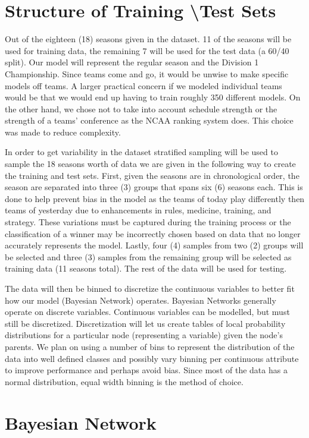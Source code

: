 \documentclass{acm_proc_article-sp}
\begin{document}
\section{Structure of Training \textbackslash Test Sets}
Out of the eighteen (18) seasons given in the dataset. 11 of the seasons will be used for training 
data, the remaining 7 will be used for the test data (a 60/40 split). Our model will represent the 
regular season and the Division 1 Championship. Since teams come and go, it would be unwise to make 
specific models off teams. A larger practical concern if we modeled individual teams would be that 
we would end up having to train roughly 350 different models. On the other hand, we chose not to 
take into account schedule strength or the strength of a teams' conference as the NCAA ranking 
system does. This choice was made to reduce complexity.

In order to get variability in the dataset stratified sampling will be used to sample the 18 seasons 
worth of data we are given in the following way to create the training and test sets. First, given 
the seasons are in chronological order, the season are separated into three (3) groups that spans 
six (6) seasons each. This is done to help prevent bias in the model as the teams of today play 
differently then teams of yesterday due to enhancements in rules, medicine, training, and strategy. 
These variations must be captured  during the training process or the classification of a winner may 
be incorrectly chosen based on data that no longer accurately represents the model. Lastly, four (4) 
samples from two (2) groups will be selected and three (3) samples from the remaining group will be 
selected as training data (11 seasons total). The rest of the data will be used for testing.

The data will then be binned to discretize the continuous variables to better fit how our model 
(Bayesian Network) operates. Bayesian Networks generally operate on discrete variables. Continuous 
variables can be modelled, but must still be discretized.\cite{cobb} Discretization will let us 
create tables of local probability distributions for a particular node (representing a variable) 
given the node's parents. We plan on using a number of bins to represent the distribution of the 
data into well defined classes and possibly vary binning per continuous attribute to improve 
performance and perhaps avoid bias. Since most of the data has a normal distribution, equal width 
binning is the method of choice.
\newpage
\section{Bayesian Network}
\end{document}

